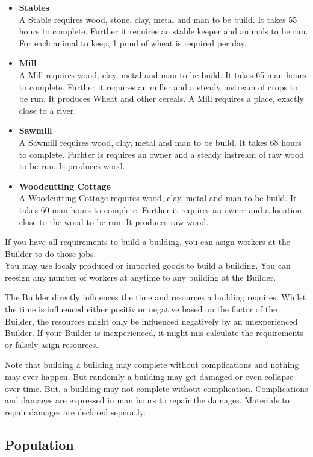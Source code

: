 \documentclass[10pt,twoside,twocolumn,openany]{book}
\begin{document}
\begin{itemize}
\item \textbf{Stables} \\ A Stable requires wood, stone, clay, metal and man to be build. It takes 55 hours to complete. Further it requires an stable keeper and animals to be run. For each animal to keep, 1 pund of wheat is required per day.
\item \textbf{Mill} \\ A Mill requires wood, clay, metal and man to be build. It takes 65 man hours to complete. Further it requires an miller and a steady instream of crops to be run. It produces Wheat and other cereals. A Mill requires a place, exactly close to a river.
\item \textbf{Sawmill} \\ A Sawmill requires wood, clay, metal and man to be build. It takes 68 hours to complete. Furhter is requires an owner and a steady instream of raw wood to be run. It produces wood.
\item \textbf{Woodcutting Cottage} \\ A Woodcutting Cottage requires wood, clay, metal and man to be build. It takes 60 man hours to complete. Further it requires an owner and a location close to the wood to be run. It produces raw wood.
\end{itemize}

If you have all requirements to build a building, you can asign workers at the Builder to do those jobs.\\
You may use localy produced or imported goods to build a building. You can reesign any number of workers at anytime to any building at the Builder.

The Builder directly influences the time and resources a building requires. Whilst the time is influenced either positiv or negative based on the factor of the Builder, the resources might only be influenced negatively by an unexperienced Builder. If your Builder is inexperienced, it might mis calculate the requirements or falsely asign resources.

Note that building a building may complete without complications and nothing may ever happen. But randomly a building may get damaged or even collapse over time. But, a building may not complete without complication. Complications and damages are expressed in man hours to repair the damages. Materials to repair damages are declared seperatly.

\subsection{Population}
\end{document}
